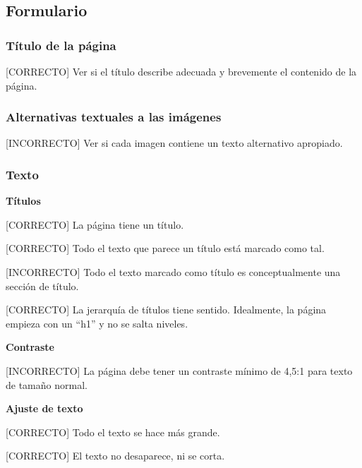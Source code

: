 \documentclass[spanish]{article}
\begin{document}
\subsection{Formulario}

\subsubsection{Título de la página}

[CORRECTO] Ver si el título describe adecuada y brevemente el contenido de la
página.

\subsubsection{Alternativas textuales a las imágenes}

[INCORRECTO] Ver si cada imagen contiene un texto alternativo apropiado.

\subsubsection{Texto}

\textbf{Títulos}\newline

[CORRECTO] La página tiene un título.\newline

[CORRECTO] Todo el texto que parece un título está marcado como tal.\newline

[INCORRECTO] Todo el texto marcado como título es conceptualmente una sección de
título.\newline

[CORRECTO] La jerarquía de títulos tiene sentido. Idealmente, la página empieza
con un ``h1'' y no se salta niveles.\newline

\newpage

\textbf{Contraste}\newline

[INCORRECTO] La página debe tener un contraste mínimo de 4,5:1 para texto de
tamaño normal.\newline

\textbf{Ajuste de texto}\newline

[CORRECTO] Todo el texto se hace más grande.\newline

[CORRECTO] El texto no desaparece, ni se corta.\newline
\end{document}
